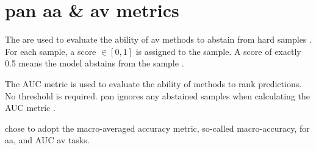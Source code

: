 \section{\ac{pan} \ac{aa} \& \ac{av} metrics}
\label{sec:pan_aa_av_metrics}

The  are used to evaluate the ability of \ac{av} methods 
to abstain from hard samples \cite{tyo_state_2022}.
For each sample, a score $\in [0, 1]$ is assigned to the sample.
A score of exactly 0.5 means the model abstains from the sample \cite{tyo_state_2022,bevendorff_overview_2024,kocher_unine_2015}.

The AUC metric is used to evaluate the ability of methods to rank predictions.
No threshold is required.
\ac{pan} ignores any abstained samples when calculating the AUC metric \cite{tyo_state_2022}.

\citet{tyo_state_2022} chose to adopt the macro-averaged accuracy metric, so-called macro-accuracy, for \ac{aa}, 
and AUC \ac{av} tasks.